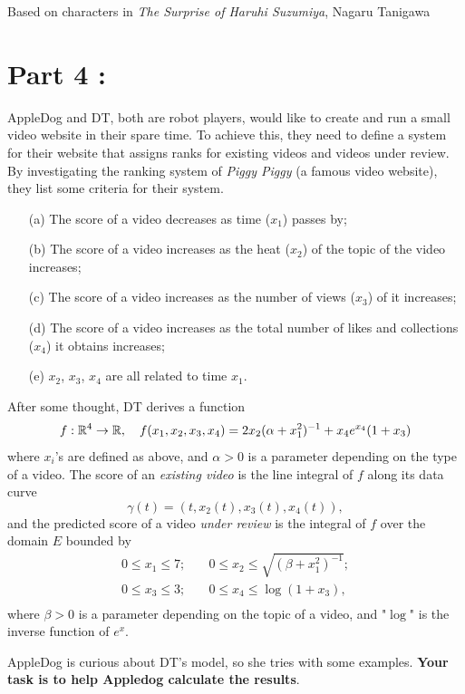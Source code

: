 \documentclass[12pt]{article}
\renewcommand{\emph}[1]{{\color{Turquoise3}\textsl{#1}}}
\begin{document}
\begin{flushright}
    Based on characters in \textsl{The Surprise of Haruhi Suzumiya}, Nagaru Tanigawa
\end{flushright}

\newpage
\section*{Part 4 : }

AppleDog and DT, both are robot players, would like to create and run a small video website in their spare time. To achieve this, they need to define a system for their website that assigns ranks for existing videos and videos under review. By investigating the ranking system of \textsl{Piggy Piggy} (a famous video website), they list some criteria for their system.
\begin{itemize}
    \item[(a)] The score of a video decreases as time (\emph{$x_1$}) passes by;
    \item[(b)] The score of a video increases as the heat (\emph{$x_2$}) of the topic of the video increases;
    \item[(c)] The score of a video increases as the number of views (\emph{$x_3$}) of it increases;
    \item[(d)] The score of a video increases as the total number of likes and collections (\emph{$x_4$}) it obtains increases;
    \item[(e)] $x_2$, $x_3$, $x_4$ are all related to time \emph{$x_1$}. 
\end{itemize}
\par After some thought, DT derives a function 
\begin{equation*}
    f:\mathbb{R}^4 \to \mathbb{R},\quad f(x_1, x_2, x_3, x_4) = 2 x_2(\alpha + x_1^2)^{-1} + x_4e^{x_4}(1 + x_3)
\end{equation*}
where $x_i$'s are defined as above, and $\alpha > 0$ is a parameter depending on the type of a video. The score of an \textsl{existing video} is the line integral of $f$ along its data curve
\begin{equation*}
    \gamma(t)=(t,x_2(t),x_3(t),x_4(t)), 
\end{equation*}
and the predicted score of a video \textsl{under review} is the integral of $f$ over the domain $E$ bounded by
\begin{equation*}
    \begin{split}
        0 \leq x_1\leq 7;& \quad 0 \leq x_2 \leq \sqrt{(\beta + x_1^2)^{-1}};\\
        0 \leq x_3 \leq 3;& \quad 0 \leq x_4 \leq \log(1 + x_3),\\ 
    \end{split}
\end{equation*}
where $\beta > 0$ is a parameter depending on the topic of a video, and "$\log$" is the inverse function of $e^x$.
\par AppleDog is curious about DT's model, so she tries with some examples. \textbf{Your task is to help Appledog calculate the results}. 
\end{document}
